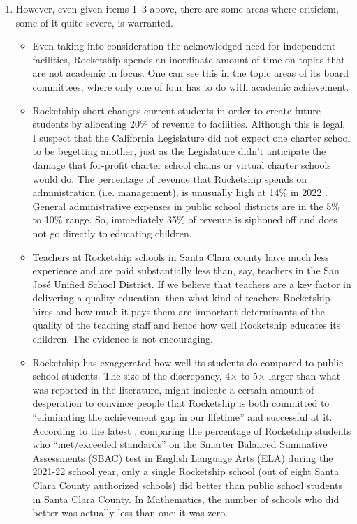 \begin{enumerate}[topsep=0.3\baselineskip,itemsep=0.25\baselineskip]
  \item However, even given items 1–3 above, there are some areas where criticism, some of it quite severe, is warranted.

  \begin{itemize}[topsep=0.125\baselineskip,itemsep=0.25\baselineskip]
    \item Even taking into consideration the acknowledged need for independent facilities, Rocketship spends an inordinate amount of time on topics that are not academic in focus. One can see this in the topic areas of its board committees, where only one of four has to do with academic achievement.
      \item Rocketship short-changes current students in order to create future students by allocating 20\% of revenue to facilities. Although this is legal, I suspect that the California Legislature did not expect one charter school to be begetting another, just as the Legislature didn't anticipate the damage that for-profit charter school chains or virtual charter schools would do.
      The percentage of revenue that Rocketship spends on administration (i.e. management), is unusually high at 14\% in 2022 \parencite[38]{RSEA2022}. General administrative expenses in public school districts are in the 5\% to 10\% range. So, immediately 35\% of revenue is siphoned off and does not go directly to educating children.
      \item Teachers at Rocketship schools in Santa Clara county have much less experience and are paid substantially less than, say, teachers in the San José Unified School District. If we believe that teachers are a key factor in delivering a quality education, then what kind of teachers Rocketship hires and how much it pays them are important determinants of the quality of the teaching staff and hence how well Rocketship educates its children. The evidence is not encouraging.
      \item Rocketship has exaggerated how well its students do compared to public school students. The size of the discrepancy, 4× to 5× larger than what was reported in the literature, might indicate a certain amount of desperation to convince people that Rocketship is both committed to ``eliminating the achievement gap in our lifetime'' and successful at it.\\
      According to the latest , comparing the percentage of Rocketship students who ``met/exceeded standards'' on the Smarter Balanced Summative Assessments (SBAC) test in English Language Arts (ELA) during the 2021-22 school year, only a single Rocketship school (out of eight Santa Clara County authorized schools) did better than public school students in Santa Clara County. In Mathematics, the number of schools who did better was actually less than one; it was zero.\\

\end{itemize}
\end{enumerate}
